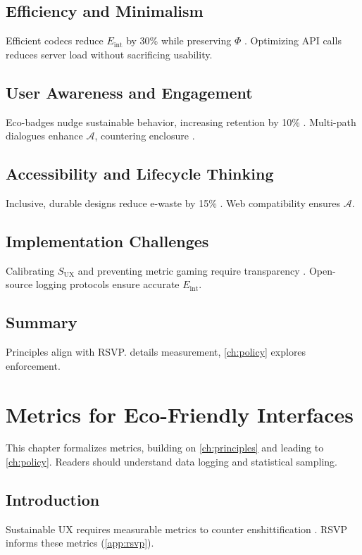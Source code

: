 \documentclass[openany]{book}
\newcommand{\PhiS}{\Phi} %
\newcommand{\Eint}{E_{\mathrm{int}}} %
\newcommand{\Auton}{\mathcal{A}} %
\newcommand{\SUX}{S_{\mathrm{UX}}} %
\begin{document}
{{{\section{Efficiency and Minimalism}
\label{sec:principles-efficiency}
Efficient codecs reduce \(\Eint\) by 30\% while preserving \(\PhiS\) \citep{extentia2024}. Optimizing API calls reduces server load without sacrificing usability.

\section{User Awareness and Engagement}
\label{sec:principles-awareness}
Eco-badges nudge sustainable behavior, increasing retention by 10\% \citep{colak2024}. Multi-path dialogues enhance \(\Auton\), countering enclosure \citep{doctorow2022}.

\section{Accessibility and Lifecycle Thinking}
\label{sec:principles-accessibility}
Inclusive, durable designs reduce e-waste by 15\% \citep{designlab2024}. Web compatibility ensures \(\Auton\).

\section{Implementation Challenges}
\label{sec:principles-challenges}
Calibrating \(\SUX\) and preventing metric gaming require transparency \citep{colak2024}. Open-source logging protocols ensure accurate \(\Eint\).

\section{Summary}
Principles align with RSVP.  details measurement, \cref{ch:policy} explores enforcement.

\chapter{Metrics for Eco-Friendly Interfaces}
\label{ch:metrics}

This chapter formalizes metrics, building on \cref{ch:principles} and leading to \cref{ch:policy}. Readers should understand data logging and statistical sampling.

\section{Introduction}
\label{sec:metrics-intro}
Sustainable UX requires measurable metrics to counter enshittification \citep{prigogine1984,doctorow2022}. RSVP informs these metrics (\cref{app:rsvp}).

}}}
\end{document}
